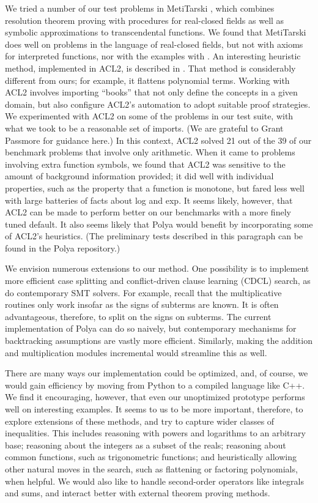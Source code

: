 \documentclass[runningheds]{llncs}
\begin{document}
We tried a number of our test problems in MetiTarski \cite{akbarpour:paulson:08}, which combines resolution theorem proving with procedures for real-closed fields as well as symbolic approximations to transcendental functions. We found that MetiTarski does well on problems in the language of real-closed fields, but not with axioms for interpreted functions, nor with the examples with . An interesting heuristic method, implemented in ACL2, is described in \cite{hunt:et:al:03}. That method is considerably different from ours; for example, it flattens polynomial terms. Working with ACL2 involves importing ``books'' that not only define the concepts in a given domain, but also configure ACL2's automation to adopt suitable proof strategies. We experimented with ACL2 on some of the problems in our test suite, with what we took to be a reasonable set of imports. (We are grateful to Grant Passmore for guidance here.) In this context, ACL2 solved 21 out of the 39 of our benchmark problems that involve only arithmetic. When it came to problems involving extra function symbols, we found that ACL2 was sensitive to the amount of background information provided; it did well with individual properties, such as the property that a function is monotone, but fared less well with large batteries of facts about log and exp. It seems likely, however, that ACL2 can be made to perform better on our benchmarks with a more finely tuned default. It also seems likely that Polya would benefit by incorporating some of ACL2's heuristics. (The preliminary tests described in this paragraph can be found in the Polya repository.)

We envision numerous extensions to our method. One possibility is to implement more efficient case splitting and conflict-driven clause learning (CDCL) search, as do contemporary SMT solvers. For example, recall that the multiplicative routines only work insofar as the signs of subterms are known. It is often advantageous, therefore, to split on the signs on subterms. The current implementation of Polya can do so naively, but contemporary mechanisms for backtracking assumptions are vastly more efficient. Similarly, making the addition and multiplication modules incremental would streamline this as well.

There are many ways our implementation could be optimized, and, of course, we would gain efficiency by moving from Python to a compiled language like C++. We find it encouraging, however, that even our unoptimized prototype performs well on interesting examples. It seems to us to be more important, therefore, to explore extensions of these methods, and try to capture wider classes of inequalities. This includes reasoning with powers and logarithms to an arbitrary base; reasoning about the integers as a subset of the reals; reasoning about common functions, such as trigonometric functions; and heuristically allowing other natural moves in the search, such as flattening or factoring polynomials, when helpful. We would also like to handle second-order operators like integrals and sums, and interact better with external theorem proving methods.
\end{document}
